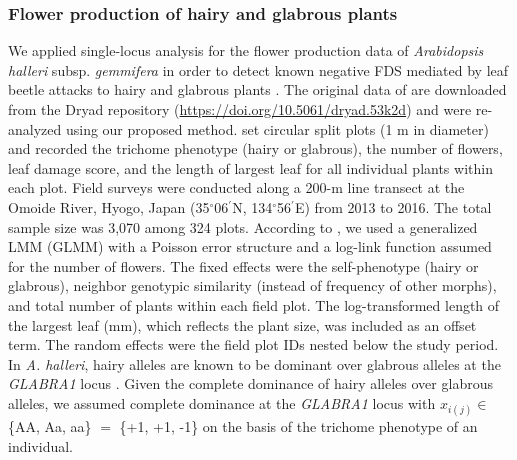\documentclass[12pt,]{article}
\begin{document}
\subsubsection{Flower production of hairy and glabrous plants}
We applied single-locus analysis for the flower production data of \textit{Arabidopsis halleri} subsp. \textit{gemmifera} in order to detect known negative FDS mediated by leaf beetle attacks to hairy and glabrous plants \citep{sato2017herbivore}. The original data of \cite{sato2017herbivore} are downloaded from the Dryad repository (\url{https://doi.org/10.5061/dryad.53k2d}) and were re-analyzed using our proposed method. \cite{sato2017herbivore} set circular split plots (1 m in diameter) and recorded the trichome phenotype (hairy or glabrous), the number of flowers, leaf damage score, and the length of largest leaf for all individual plants within each plot. Field surveys were conducted along a 200-m line transect at the Omoide River, Hyogo, Japan (35$^\circ$06$^\prime$N, 134$^\circ$56$^\prime$E) from 2013 to 2016. The total sample size was 3,070 among 324 plots. According to \cite{sato2017herbivore}, we used a generalized LMM (GLMM) with a Poisson error structure and a log-link function assumed for the number of flowers. The fixed effects were the self-phenotype (hairy or glabrous), neighbor genotypic similarity (instead of frequency of other morphs), and total number of plants within each field plot. The log-transformed length of the largest leaf (mm), which reflects the plant size, was included as an offset term. The random effects were the field plot IDs nested below the study period. In \textit{A. halleri}, hairy alleles are known to be dominant over glabrous alleles at the \textit{GLABRA1} locus \citep{shimizu2002ecology, kawagoe2011coexistence}. Given the complete dominance of hairy alleles over glabrous alleles, we assumed complete dominance at the \textit{GLABRA1} locus with $x_{i(j)} \in$ \{AA, Aa, aa\} $=$ \{+1, +1, -1\} on the basis of the trichome phenotype of an individual.
\end{document}
